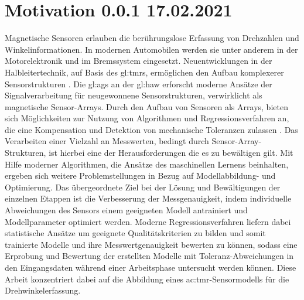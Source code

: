%

\chapter{Motivation 0.0.1 17.02.2021}\label{ch:motivation}

Magnetische Sensoren erlauben die berührungslose Erfassung von Drehzahlen und Winkelinformationen. In modernen Automobilen werden sie unter anderem in der Motorelektronik und im Bremssystem
eingesetzt.
Neuentwicklungen in der Halbleitertechnik, auf Basis des \gls{gl:tmr}s, ermöglichen den Aufbau komplexerer Sensorstrukturen \cite{Schuethe2019}. Die \gls{gl:ags} an der \gls{gl:haw} erforscht moderne Ansätze der Signalverarbeitung für neugewonnene Sensorstrukturen, verwirklicht als magnetische Sensor-Arrays. Durch den Aufbau von Sensoren als Arrays, bieten sich Möglichkeiten zur Nutzung von Algorithmen und Regressionsverfahren an, die eine Kompensation und Detektion von mechanische Toleranzen zulassen \cite{Schuethe2020}.
\newline
Das Verarbeiten einer Vielzahl an Messwerten, bedingt durch Sensor-Array-Strukturen, ist hierbei eine der Herausforderungen die es zu bewältigen gilt. Mit Hilfe moderner Algorithmen, die Ansätze des maschinellen Lernens beinhalten, ergeben sich weitere Problemstellungen in Bezug auf Modellabbildung- und Optimierung.
Das übergeordnete Ziel bei der Lösung und Bewältigungen der einzelnen Etappen ist die Verbesserung der Messgenauigkeit, indem individuelle Abweichungen des Sensors einem geeigneten Modell antrainiert und Modellparameter optimiert werden.
\newline
Moderne Regressionsverfahren liefern dabei statistische Ansätze um geeignete Qualitätskriterien zu bilden und somit trainierte Modelle und ihre Messwertgenauigkeit bewerten zu können, sodass eine Erprobung und Bewertung der erstellten Modelle mit Toleranz-Abweichungen in den Eingangsdaten während einer Arbeitsphase untersucht werden können.
Diese Arbeit konzentriert dabei auf die Abbildung eines \gls{ac:tmr}-Sensormodells für die Drehwinkelerfassung.

\clearpage


